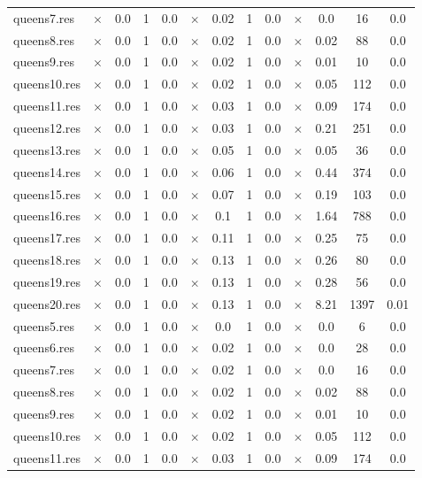 \documentclass[main.tex]{subfiles}
\begin{document}
\begin{landscape}
\begin{center}
\begin{tabular}{lcccccccccccc}
\\
queens7.res & $\times$ & 0.0 & 1 & 0.0
 & $\times$ & 0.02 & 1 & 0.0
 & $\times$ & 0.0 & 16 & 0.0
\\
queens8.res & $\times$ & 0.0 & 1 & 0.0
 & $\times$ & 0.02 & 1 & 0.0
 & $\times$ & 0.02 & 88 & 0.0
\\
queens9.res & $\times$ & 0.0 & 1 & 0.0
 & $\times$ & 0.02 & 1 & 0.0
 & $\times$ & 0.01 & 10 & 0.0
\\
queens10.res & $\times$ & 0.0 & 1 & 0.0
 & $\times$ & 0.02 & 1 & 0.0
 & $\times$ & 0.05 & 112 & 0.0
\\
queens11.res & $\times$ & 0.0 & 1 & 0.0
 & $\times$ & 0.03 & 1 & 0.0
 & $\times$ & 0.09 & 174 & 0.0
\\
queens12.res & $\times$ & 0.0 & 1 & 0.0
 & $\times$ & 0.03 & 1 & 0.0
 & $\times$ & 0.21 & 251 & 0.0
\\
queens13.res & $\times$ & 0.0 & 1 & 0.0
 & $\times$ & 0.05 & 1 & 0.0
 & $\times$ & 0.05 & 36 & 0.0
\\
queens14.res & $\times$ & 0.0 & 1 & 0.0
 & $\times$ & 0.06 & 1 & 0.0
 & $\times$ & 0.44 & 374 & 0.0
\\
queens15.res & $\times$ & 0.0 & 1 & 0.0
 & $\times$ & 0.07 & 1 & 0.0
 & $\times$ & 0.19 & 103 & 0.0
\\
queens16.res & $\times$ & 0.0 & 1 & 0.0
 & $\times$ & 0.1 & 1 & 0.0
 & $\times$ & 1.64 & 788 & 0.0
\\
queens17.res & $\times$ & 0.0 & 1 & 0.0
 & $\times$ & 0.11 & 1 & 0.0
 & $\times$ & 0.25 & 75 & 0.0
\\
queens18.res & $\times$ & 0.0 & 1 & 0.0
 & $\times$ & 0.13 & 1 & 0.0
 & $\times$ & 0.26 & 80 & 0.0
\\
queens19.res & $\times$ & 0.0 & 1 & 0.0
 & $\times$ & 0.13 & 1 & 0.0
 & $\times$ & 0.28 & 56 & 0.0
\\
queens20.res & $\times$ & 0.0 & 1 & 0.0
 & $\times$ & 0.13 & 1 & 0.0
 & $\times$ & 8.21 & 1397 & 0.01
\\
queens5.res & $\times$ & 0.0 & 1 & 0.0
 & $\times$ & 0.0 & 1 & 0.0
 & $\times$ & 0.0 & 6 & 0.0
\\
queens6.res & $\times$ & 0.0 & 1 & 0.0
 & $\times$ & 0.02 & 1 & 0.0
 & $\times$ & 0.0 & 28 & 0.0
\\
queens7.res & $\times$ & 0.0 & 1 & 0.0
 & $\times$ & 0.02 & 1 & 0.0
 & $\times$ & 0.0 & 16 & 0.0
\\
queens8.res & $\times$ & 0.0 & 1 & 0.0
 & $\times$ & 0.02 & 1 & 0.0
 & $\times$ & 0.02 & 88 & 0.0
\\
queens9.res & $\times$ & 0.0 & 1 & 0.0
 & $\times$ & 0.02 & 1 & 0.0
 & $\times$ & 0.01 & 10 & 0.0
\\
queens10.res & $\times$ & 0.0 & 1 & 0.0
 & $\times$ & 0.02 & 1 & 0.0
 & $\times$ & 0.05 & 112 & 0.0
\\
queens11.res & $\times$ & 0.0 & 1 & 0.0
 & $\times$ & 0.03 & 1 & 0.0
 & $\times$ & 0.09 & 174 & 0.0
\\
\hline\end{tabular}
\end{center}
\end{landscape}
\end{document}
